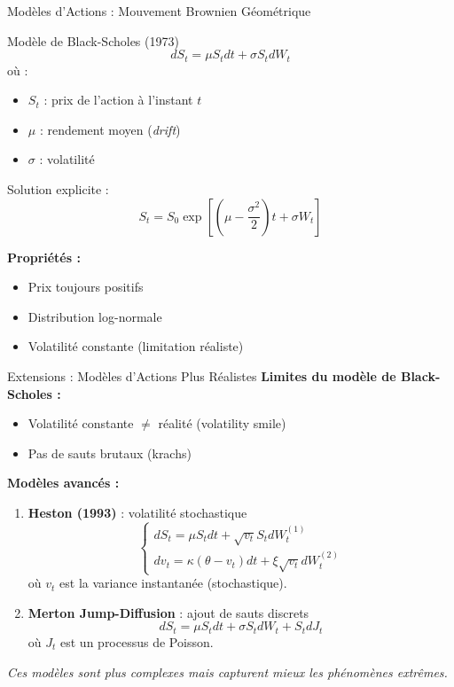 \documentclass[10pt,aspectratio=169]{beamer}
\begin{document}
\begin{frame}{Modèles d'Actions : Mouvement Brownien Géométrique}
\begin{block}{Modèle de Black-Scholes (1973)}
\[
dS_t = \mu S_t dt + \sigma S_t dW_t
\]
où :
\begin{itemize}
    \item $S_t$ : prix de l'action à l'instant $t$
    \item $\mu$ : rendement moyen (\textit{drift})
    \item $\sigma$ : volatilité
\end{itemize}

Solution explicite :
\[
S_t = S_0 \exp\left[\left(\mu - \frac{\sigma^2}{2}\right)t + \sigma W_t\right]
\]
\end{block}

\textbf{Propriétés :}
\begin{itemize}
    \item Prix toujours positifs
    \item Distribution log-normale
    \item Volatilité constante (limitation réaliste)
\end{itemize}
\end{frame}

\begin{frame}{Extensions : Modèles d'Actions Plus Réalistes}
\textbf{Limites du modèle de Black-Scholes :}
\begin{itemize}
    \item Volatilité constante $\neq$ réalité (volatility smile)
    \item Pas de sauts brutaux (krachs)
\end{itemize}

\vspace{0.3cm}
\textbf{Modèles avancés :}
\begin{enumerate}
    \item \textbf{Heston (1993)} : volatilité stochastique
    \[
    \begin{cases}
    dS_t = \mu S_t dt + \sqrt{v_t} S_t dW^{(1)}_t \\
    dv_t = \kappa(\theta - v_t)dt + \xi \sqrt{v_t} dW^{(2)}_t
    \end{cases}
    \]
    où $v_t$ est la variance instantanée (stochastique).
    \item \textbf{Merton Jump-Diffusion} : ajout de sauts discrets
    \[
    dS_t = \mu S_t dt + \sigma S_t dW_t + S_t dJ_t
    \]
    où $J_t$ est un processus de Poisson.
\end{enumerate}

\vspace{0.2cm}
\textit{Ces modèles sont plus complexes mais capturent mieux les phénomènes extrêmes.}
\end{frame}
\end{document}
